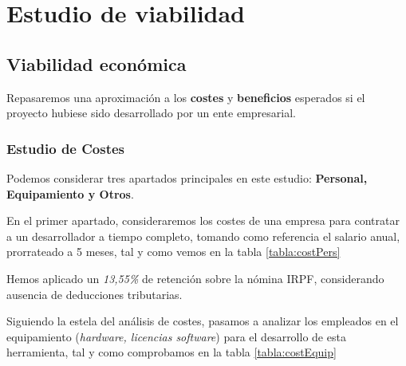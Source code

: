\newpage

\section{Estudio de viabilidad}

\subsection{Viabilidad económica}

Repasaremos una aproximación a los \textbf{costes} y \textbf{beneficios} esperados si el proyecto hubiese sido desarrollado por un ente empresarial.

\subsubsection{Estudio de Costes}

Podemos considerar tres apartados principales en este estudio:
\textbf{Personal, Equipamiento y Otros}. 

En el primer apartado, consideraremos los costes de una empresa para contratar a un desarrollador a tiempo completo, tomando como referencia el salario anual, prorrateado a 5 meses, tal y como vemos en la tabla \ref{tabla:costPers}


Hemos aplicado un \textit{13,55\%} de retención sobre la nómina IRPF, considerando ausencia de deducciones tributarias.

Siguiendo la estela del análisis de costes, pasamos a analizar los empleados en el equipamiento (\textit{hardware, licencias software}) para el desarrollo de esta herramienta, tal y como comprobamos en la tabla \ref{tabla:costEquip}


